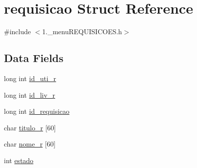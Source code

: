 \hypertarget{structrequisicao}{\section{requisicao Struct Reference}
\label{structrequisicao}
}


{\ttfamily \#include $<$1.\+\_\+menu\+R\+E\+Q\+U\+I\+S\+I\+C\+O\+E\+S.\+h$>$}

\subsection*{Data Fields}
\begin{DoxyCompactItemize}
\item 
long int \hyperlink{structrequisicao_a46ba42e509577cf7ad9429d2293ff577}{id\+\_\+uti\+\_\+r}
\item 
long int \hyperlink{structrequisicao_af636ce6e374d3e55eeb00565c29faf01}{id\+\_\+liv\+\_\+r}
\item 
long int \hyperlink{structrequisicao_a83bcbbb52167d11b977097b6e3c282c9}{id\+\_\+requisicao}
\item 
char \hyperlink{structrequisicao_aa943485cb21e39e8c25250f36453db59}{titulo\+\_\+r} \mbox{[}60\mbox{]}
\item 
char \hyperlink{structrequisicao_a1c7ba6d3e1e3e317652826e28fd517aa}{nome\+\_\+r} \mbox{[}60\mbox{]}
\item 
int \hyperlink{structrequisicao_a876d08c1d21086e4fd228744da10d028}{estado}
\end{DoxyCompactItemize}


